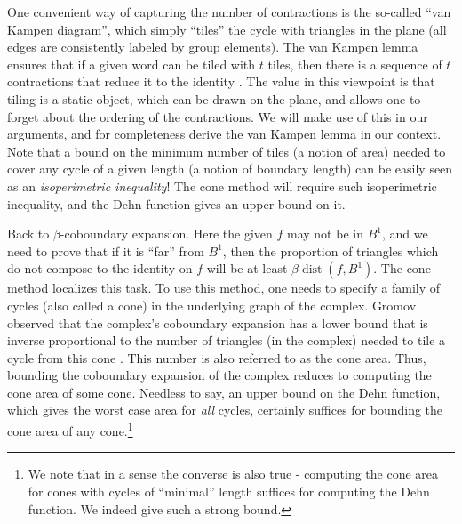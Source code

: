 \documentclass[10pt,a4paper]{article}
\theoremstyle{definition}
\theoremstyle{remark}
\DeclareMathOperator{\dist}{dist}
\numberwithin{equation}{section}
\begin{document}
One convenient way of capturing the number of contractions is the so-called ``van Kampen diagram'', which simply ``tiles'' the cycle with triangles in the plane (all edges are consistently labeled by group elements). The van Kampen lemma ensures that if a given word can be tiled with $t$ tiles, then there is a sequence of $t$ contractions that reduce it to the identity \cite{VanKampen1933}. The value in this viewpoint is that tiling is a static object, which can be drawn on the plane, and allows one to forget about the ordering of the contractions.
%
We will make use of this in our arguments, and for completeness derive the van Kampen lemma in our context. Note that a bound on the minimum number of tiles (a notion of area) needed to cover any cycle of a given length (a notion of boundary length) can be easily seen as an \emph{isoperimetric inequality}! %
The cone method will require such isoperimetric inequality, and the Dehn function gives an upper bound on it.

Back to $\beta$-coboundary expansion. Here the given $f$ may not be in $B^1$, and we need to prove that if it is ``far'' from $B^1$, then the proportion of triangles which do not compose to the identity on $f$ will be at least $\beta \dist(f,B^1)$. The cone method localizes this task. To use this method, one needs to specify a family of cycles (also called a cone) in the underlying graph of the complex. Gromov observed that the complex's coboundary expansion has a lower bound that is inverse proportional to the number of triangles (in the complex) needed to tile a cycle from this cone \cite{Gromov2010}. This number is also referred to as the cone area.
Thus, bounding the coboundary expansion of the complex reduces to computing the cone area of some cone. Needless to say, an upper bound on the Dehn function, which gives the worst case area for \emph{all} cycles, certainly suffices for bounding the cone area of any cone.\footnote{We note that in a sense the converse is also true - computing the cone area for cones with cycles of ``minimal'' length suffices for computing the Dehn function. We indeed give such a strong bound.}
\end{document}

